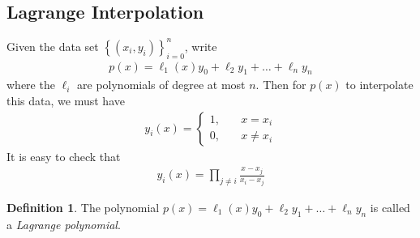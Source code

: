 \documentclass[12pt]{article}
\theoremstyle{plain}
\theoremstyle{definition}
\newtheorem*{definition}{Definition}
\theoremstyle{remark}
\numberwithin{equation}{section}  %
\begin{document}
\subsection{Lagrange Interpolation}
Given the data set $ \left\{ (x_i, y_i) \right\}_{i=0}^{n}$,
write
\begin{align*}
p(x) = \ell_1(x) y_0 + \ell_2 y_1 + \ldots + \ell_n y_n
\end{align*}
where the $\ell_i$ are polynomials of degree at most $n$. 
Then for $p(x)$ to interpolate this data, we must have
\begin{align*}
y_i(x) = \begin{cases}
1, \quad & x = x_i \\
0, \quad & x \neq x_i
\end{cases}
\end{align*}
It is easy to check that
\begin{align*}
y_i(x) = \prod_{j \neq i} \frac{x - x_j}{x_i - x_j}
\end{align*}
\begin{definition}
The polynomial $p(x) = \ell_1(x) y_0 + \ell_2 y_1 + \ldots + \ell_n y_n$
is called a \emph{Lagrange polynomial}.
\end{definition}
\end{document}
